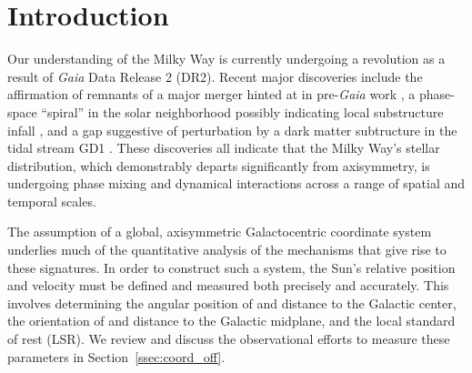 \documentclass[twocolumn]{aastex62}
\newcommand{\pc}{\text{pc}}
\newcommand{\kms}{\text{km}\,\text{s}^{-1}}
\begin{document}
\begin{abstract}

\end{abstract}


\section{Introduction} \label{sec:intro} Our understanding of the Milky Way is
currently undergoing a revolution as a result of \textit{Gaia} Data Release 2
(DR2). Recent major discoveries include the affirmation of remnants of a major
merger \citep{2018ApJ...860L..11K, 2018MNRAS.478..611B, 2018Natur.563...85H,
2019MNRAS.486..378L, 2019MNRAS.482.3426M} hinted at in pre-\textit{Gaia} work
\citep[e.g.,][]{2005MNRAS.359...93M, 2011MNRAS.412.1203N}, a phase-space
``spiral'' in the solar neighborhood \citep{2018Natur.561..360A} possibly
indicating local substructure infall \citep{2018MNRAS.481.1501B,
2019MNRAS.485.3134L}, and a gap suggestive of perturbation by a dark matter
subtructure in the tidal stream GD1 \citep{2018ApJ...863L..20P,
2018arXiv181103631B}. These discoveries all indicate that the Milky Way's
stellar distribution, which demonstrably departs significantly from axisymmetry,
is undergoing phase mixing and dynamical interactions across a range of spatial
and temporal scales.

The assumption of a global, axisymmetric Galactocentric coordinate system
\citep{2008gady.book.....B} underlies much of the quantitative analysis of the
mechanisms that give rise to these signatures. 
In order to 
construct such a
system, the Sun's relative position and velocity must be defined and measured both precisely
and accurately. This involves determining the angular position of and distance
to the Galactic center, the orientation of and distance to the Galactic midplane,
and the local standard of rest (LSR). We review
and discuss the observational efforts to measure these parameters in
Section~\ref{ssec:coord_off}.
\end{document}
